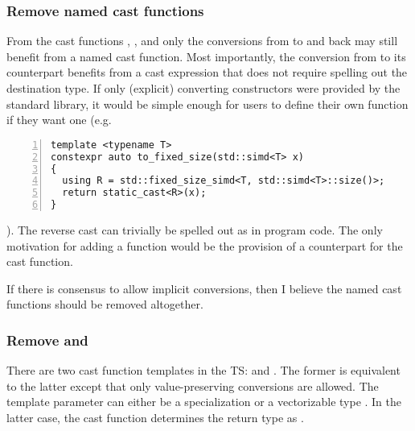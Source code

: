 \subsubsection{Remove named cast functions}

From the cast functions \stdx{}, \stdx{}, and
\stdx{} only the conversions from \simdabi{} to \simdabi{} and back may still benefit from a named cast
function.
Most importantly, the conversion from  to its 
counterpart benefits from a cast expression that does not require spelling out
the destination type.
If only (explicit) converting constructors were provided by the standard
library, it would be simple enough for users to define their own
 function if they want one (e.g.
\begin{lstlisting}[numbers=left,float={hbtp},label=lst:userdefined-to-fixed-size,caption={
  Example of a user-defined \code{to_fixed_size} implementation if explicit casts are provided
}]
template <typename T>
constexpr auto to_fixed_size(std::simd<T> x)
{
  using R = std::fixed_size_simd<T, std::simd<T>::size()>;
  return static_cast<R>(x);
}
\end{lstlisting}
).
The reverse cast can trivially be spelled out as 
in program code.
The only motivation for adding a  function would be the
provision of a counterpart for the  cast function.

If there is consensus to allow implicit conversions, then I believe the named
cast functions should be removed altogether.

\subsubsection{Remove  and }
There are two cast function templates in the TS:  and
.
The former is equivalent to the latter except that only value-preserving
conversions are allowed.
The template parameter can either be a  specialization or a
vectorizable type .
In the latter case, the cast function determines the return type as
.

